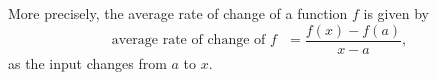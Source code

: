 \documentclass{ximera}
\begin{document}
More precisely, the average rate of change of a function $f$ is given by
\[
{\text{average rate of change of  $f$ }}
=\frac{f(x)-f(a)}{x-a},
\]
as the input changes from $a$ to $x$.
\begin{comment}
\begin{image}
\begin{tikzpicture}
	
          \begin{axis}[
            clip=false, domain=0:2.5, axis lines =middle, xlabel=$x$,
            ylabel=$y$, every axis y label/.style={at=(current
              axis.above origin),anchor=south}, 
             width=4in,
          ticks=none ]   
                             \addplot [very thick, penColor,smooth] {(x-1)^2 };
      
       \addplot[decoration={brace,mirror,raise=.06cm},decorate,thin] plot coordinates
                       {(2,0.45) (2,1)};
                         \addplot[decoration={brace,mirror,raise=.06cm},decorate,thin] plot coordinates
                       {(1.65,0.45) (2,0.45)};
           \node at (axis cs:0,-0.1) {$0$};
             \addplot [very thick,penColor2,->]  plot coordinates {(2,0.45) (2,1)};
             \addplot [very thick,penColor4,->]  plot coordinates {(1.65,0.45) (2,0.45)};
              \addplot [very thick,penColor, dashed]  plot coordinates {(1.65,0) (1.65,0.45)};
               \addplot[only marks,very thick,penColor,mark=*]
	        coordinates{(1.65,0.45)};
	        \addplot[only marks,very thick,penColor,mark=*]
	        coordinates{(2,1)};
              \addplot [very thick,penColor, dashed]  plot coordinates {(2,0) (2,0.45)};
               \node at (axis cs:1.8,0.35) {$\Delta x$ };
    
                \node at (axis cs:2.5,0.71) {$\Delta y=f(x)-f(a)$ };
               \node at (axis cs:1.65,-0.1) {$a$ };
                \node at (axis cs:1.2,1.8) {average rate of change $=\frac{\Delta y}{\Delta x}=\frac{f(x)-f(a)}{x-a}$ };
               \node at (axis cs:2,-0.1) {$x$ };
                 \node at (axis cs:2.3,1) {$(x,f(x))$ };
                  \node at (axis cs:1.35,0.45) {$(a,f(a))$ };
        \end{axis}
\end{tikzpicture}
\end{image}
\end{comment}
\end{document}
